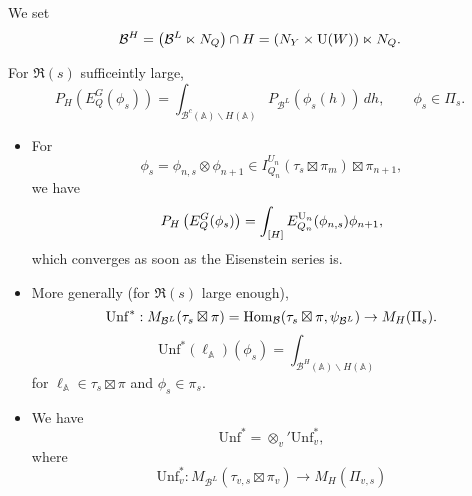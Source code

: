 \documentclass[reqno]{amsart} 
\begin{document}
We set
\begin{equation*}
  \mathcal{B}^H = \left( \mathcal{B}^L \ltimes N_Q  \right) \cap H
  = \left( N_Y \times \operatorname{U} (W)  \right) \ltimes N_Q. 
\end{equation*}
\begin{proposition}\label{proposition:cj4460mjr9}
  For $\Re(s)$ sufficeintly large,
  \begin{equation*}
    P_H \left( E_Q^G (\phi_s ) \right)
    = \int_{\mathcal{B}^c (\mathbb{A}) \backslash H (\mathbb{A})}
    P_{\mathcal{B}^L } (\phi_s (h)) \, d h,
    \qquad \phi_s \in \Pi_s.
\end{equation*}
\end{proposition}
\begin{remark}\label{remark:cj4460mibz}
  \begin{itemize}
  \item For
    \begin{equation*}
      \phi_s = \phi_{n, s} \otimes \phi_{n + 1} \in I_{Q_n }^{U_n } (\tau_s \boxtimes \pi_m ) \boxtimes \pi_{n + 1},
    \end{equation*}
    we have
    \begin{equation*}
      P_H \left( E_Q^G (\phi_s ) \right)
      = \int_{[H]}
      E_{Q_n }^{\operatorname{U}_n } (\phi_{n , s}) \phi_{n + 1},
    \end{equation*}
    which converges as soon as the Eisenstein series is.
  \item More generally (for $\Re(s)$ large enough),
    \begin{equation*}
      \mathrm{Unf}^\ast : M_{\mathcal{B}^L } (\tau_s \boxtimes \pi ) = \operatorname{Hom}_{\mathcal{B} } (\tau_s \boxtimes \pi, \psi_{\mathcal{B}^L }) \rightarrow M_H (\Pi_s).
    \end{equation*}
    \begin{equation*}
      \mathrm{Unf}^\ast ( \ell_{\mathbb{A}}) (\phi_s)
      =
      \int_{\mathcal{B}^H (\mathbb{A}) \backslash H (\mathbb{A})}
    \end{equation*}
    for $\ell_{\mathbb{A} } \in \tau_s \boxtimes \pi $ and $\phi_s \in \pi_s$.
  \item We have
    \begin{equation*}
      \mathrm{Unf}^\ast = \otimes_v ' \mathrm{Unf}_v^\ast ,
    \end{equation*}
    where
    \begin{equation*}
      \mathrm{Unf}_v^\ast : M_{\mathcal{B}^L } (\tau_{v, s} \boxtimes \pi_v ) \rightarrow M_H (\Pi_{v, s})
    \end{equation*}

\end{itemize}
\end{remark}
\end{document}
